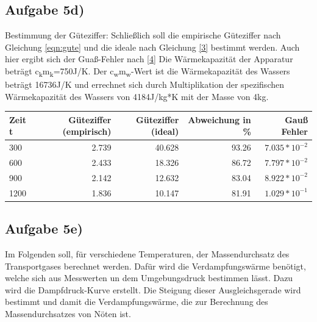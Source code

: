 \documentclass[titlepage=firstcover, captions=tableheading]{scrartcl}
\begin{document}
        \subsection{Aufgabe 5d)}
        Bestimmung der Güteziffer: Schließlich soll die empirische Güteziffer nach Gleichung \eqref{eqn:gute} und die ideale nach Gleichung \eqref{3} bestimmt werden.
        Auch hier ergibt sich der Guaß-Fehler nach \eqref{4} 
        Die Wärmekapazität der Apparatur beträgt 
        c\textsubscript{k}m\textsubscript{k}=750J/K. 
        Der c\textsubscript{w}m\textsubscript{w}-Wert ist die Wärmekapazität des Wassers beträgt 16736J/K und 
        errechnet sich durch Multiplikation der spezifischen Wärmekapazität des Wassers 
        von 4184J/kg*K mit der Masse von 4kg. 

        \begin{center}
            \begin{tabular}{lrrrr}
                \toprule
                {Zeit t} & { Güteziffer (empirisch)} & {Güteziffer (ideal)} & {Abweichung in \%} & {Gauß Fehler}\\
                \midrule
                300 & 2.739 & 40.628 & 93.26 & $7.035 * 10^{-2}$\\
                600 & 2.433 & 18.326 & 86.72 & $7.797 * 10^{-2}$\\
                900 & 2.142 & 12.632 & 83.04 & $8.922 * 10^{-2}$\\
                1200 & 1.836 & 10.147 & 81.91& $1.029 * 10^{-1}$\\
                \bottomrule
                
            \end{tabular}
        \end{center}
\subsection{Aufgabe 5e)}

Im Folgenden soll, für verschiedene Temperaturen, der Massendurchsatz des Transportgases berechnet werden.
Dafür wird die Verdampfungswärme benötigt, welche sich aus Messwerten un dem Umgebungsdruck bestimmen lässt.
Dazu wird die Dampfdruck-Kurve erstellt. 
Die Steigung dieser Ausgleichsgerade wird bestimmt und damit die Verdampfungswärme, die zur Berechnung des Massendurchsatzes von Nöten ist.
\end{document}
